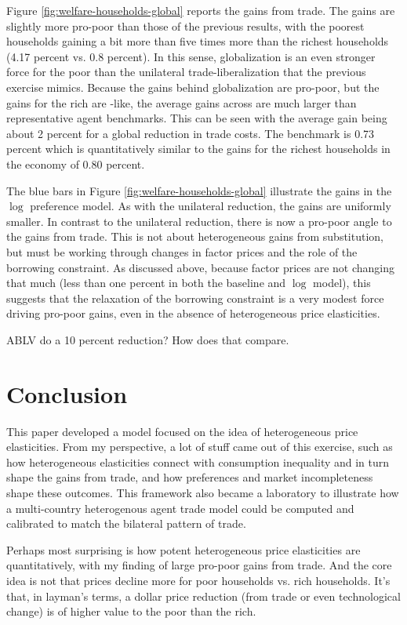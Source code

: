 \documentclass[12pt,pdftex]{article}
\begin{document}
\begin{onehalfspacing}
Figure \ref{fig:welfare-households-global} reports the gains from trade. The gains are slightly more pro-poor than those of the previous results, with the poorest households gaining a bit more than five times more than the richest households (4.17 percent vs. 0.8 percent). In this sense, globalization is an even stronger force for the poor than the unilateral trade-liberalization that the previous exercise mimics. Because the gains behind globalization are pro-poor, but the gains for the rich are \citet{arkolakis2012new}-like, the average gains across are much larger than representative agent benchmarks. This can be seen with the average gain being about 2 percent for a global reduction in trade costs. The \citet{arkolakis2012new} benchmark is 0.73 percent which is quantitatively similar to the gains for the richest households in the economy of 0.80 percent.

The blue bars in Figure \ref{fig:welfare-households-global} illustrate the gains in the $\log$ preference model. As with the unilateral reduction, the gains are uniformly smaller. In contrast to the unilateral reduction, there is now a pro-poor angle to the gains from trade. This is not about heterogeneous gains from substitution, but must be working through changes in factor prices and the role of the borrowing constraint. As discussed above, because factor prices are not changing that much (less than one percent in both the baseline and $\log$ model), this suggests that the relaxation of the borrowing constraint is a very modest force driving pro-poor gains, even in the absence of heterogeneous price elasticities.

ABLV do a 10 percent reduction? How does that compare.


\section{Conclusion}

This paper developed a model focused on the idea of heterogeneous price elasticities. From my perspective, a lot of stuff came out of this exercise, such as how heterogeneous elasticities connect with consumption inequality and in turn shape the gains from trade, and how preferences and market incompleteness shape these outcomes. This framework also became a laboratory to illustrate how a multi-country heterogenous agent trade model could be computed and calibrated to match the bilateral pattern of trade. 

Perhaps most surprising is how potent heterogeneous price elasticities are quantitatively, with my finding of large pro-poor gains from trade. And the core idea is not that prices decline more for poor households vs. rich households. It's that, in layman's terms, a dollar price reduction (from trade or even technological change) is of higher value to the poor than the rich.


\end{onehalfspacing}
\end{document}
